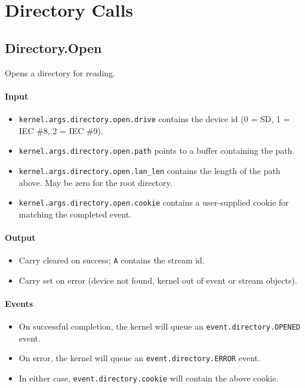 \section*{Directory Calls}

\subsection*{Directory.Open}
Opens a directory for reading.

\paragraph{Input}
\begin{itemize}
\item \verb+kernel.args.directory.open.drive+ contains the device id (0 = SD, 1 = IEC \#8, 2 = IEC \#9).
\item \verb+kernel.args.directory.open.path+ points to a buffer containing the path.
\item \verb+kernel.args.directory.open.lan_len+ contains the length of the path above.  May be zero for the root directory.
\item \verb+kernel.args.directory.open.cookie+ contains a user-supplied cookie for matching the completed event.
\end{itemize}

\paragraph{Output}
\begin{itemize}
\item Carry cleared on success; \verb+A+ contains the stream id.
\item Carry set on error (device not found, kernel out of event or stream objects).
\end{itemize}

\paragraph{Events}
\begin{itemize}
\item On successful completion, the kernel will queue an \verb+event.directory.OPENED+ event.
\item On error, the kernel will queue an \verb+event.directory.ERROR+ event.
\item In either case, \verb+event.directory.cookie+ will contain the above cookie.
\end{itemize}

